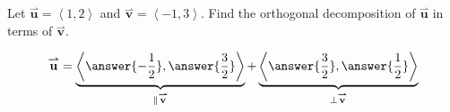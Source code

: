 \documentclass{ximera}
\author{Gregory Hartman \and Matthew Carr}
\begin{document}
\begin{exercise}
Let $\overset{\boldsymbol{\rightharpoonup}}{\mathbf{u}} = \left< 1,2 \right>$ and $\overset{\boldsymbol{\rightharpoonup}}{\mathbf{v}} = \left< -1,3 \right>$. Find the orthogonal decomposition of $\overset{\boldsymbol{\rightharpoonup}}{\mathbf{u}}$ in terms of $\overset{\boldsymbol{\rightharpoonup}}{\mathbf{v}}$.

\begin{prompt}
\[
\overset{\boldsymbol{\rightharpoonup}}{\mathbf{u}} = \underbrace{\left< \answer{-\frac{1}{2}},\answer{\frac{3}{2}} \right>}_{\parallel{\overset{\boldsymbol{\rightharpoonup}}{\mathbf{v}}}} + \underbrace{\left< \answer{\frac{3}{2}},\answer{\frac{1}{2}} \right>}_{\perp{\overset{\boldsymbol{\rightharpoonup}}{\mathbf{v}}}}
\]
\end{prompt}

\end{exercise}
\end{document}
